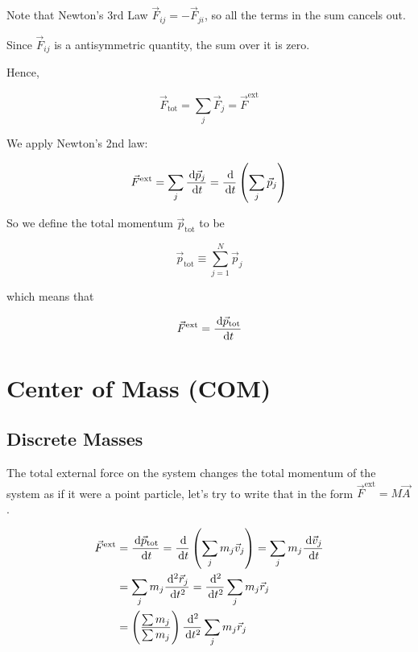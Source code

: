 Note that Newton's 3rd Law $\vec F_{ij} = - \vec F_{ji}$, so all the terms in the sum cancels out.

\begin{remark}
	Since $\vec F_{ij}$ is a antisymmetric quantity, the sum over it is zero.
\end{remark}

Hence, 

\begin{equation}
	\vec F_\mathrm{tot} = \sum_j \vec F_j = \vec F^\mathrm{ext}
\end{equation}

We apply Newton's 2nd law:

\begin{equation}
	\vec F^\mathrm{ext} = \sum_j \frac{\D \vec p_j}{\D t} = \frac{\D}{\D t} \left(\sum_j \vec p_j\right)
\end{equation}

So we define the total momentum $\vec p_\mathrm{tot}$ to be

\begin{equation}
	\vec p_\mathrm{tot} \equiv \sum_{j = 1}^N \vec p_j
\end{equation}

which means that

\begin{equation}
	\vec F^\mathrm{ext} = \frac{\D \vec p_\mathrm{tot}}{\D t}
\end{equation}

\section{Center of Mass (COM)}

\subsection{Discrete Masses}

The total external force on the system changes the total momentum of the system as if it were a point particle, let's try to write that in the form $\vec F^\mathrm{ext} = M \vec A$.

\begin{align}
	\vec F^\mathrm{ext} &= \frac{\D \vec p_\mathrm{tot}}{\D t} = \frac{\D}{\D t} \left(\sum_j m_j \vec v_j\right) = \sum_j m_j \frac{\D \vec v_j}{\D t}\\
	&= \sum_j m_j \frac{\D^2 \vec r_j}{\D t^2} = \frac{\D^2}{\D t^2} \sum_j m_j \vec r_j\\
	&= \left(\frac{\sum m_j}{\sum m_j}\right) \frac{\D^2}{\D t^2} \sum_j m_j \vec r_j
\end{align}


